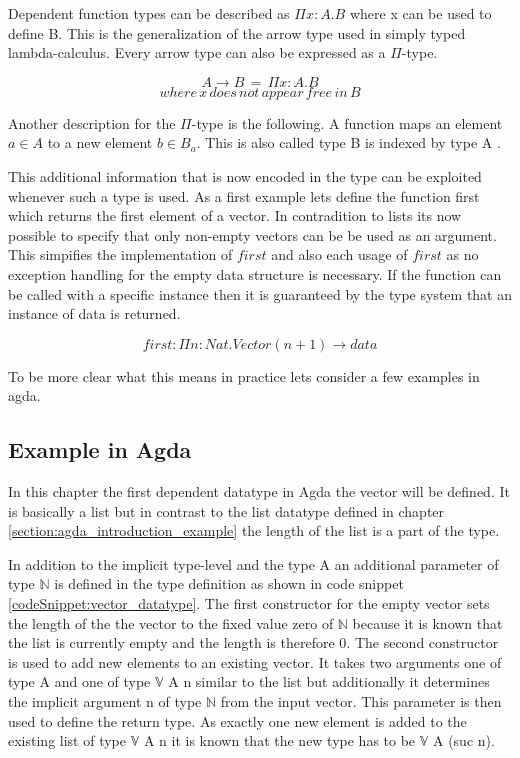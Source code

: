 Dependent function types can be described as $\Pi x : A. B$ where x can be used to define B. 
This is the generalization of the arrow type used in simply typed lambda-calculus. Every arrow type can also be expressed as a $\Pi$-type.

$$A \rightarrow B \, = \, \Pi x:A.B$$
$$where \, x \, does \, not \, appear \, free \, in \, B$$

Another description for the $\Pi$-type is the following. A function maps an element $a \in A$ to a new element $b \in B_a$. 
This is also called type B is indexed by type A \cite{10.1145/2841316}.


This additional information that is now encoded in the type can be exploited whenever such a type is used. As a first example lets define the function first which returns the first element of a vector.
In contradition to lists its now possible to specify that only non-empty vectors can be be used as an argument. 
This simpifies the implementation of $first$ and also each usage of $first$ as no exception handling for the empty data structure is necessary. 
If the function can be called with a specific instance then it is guaranteed by the type system that an instance of data is returned.

$$first : \Pi n : Nat.Vector(n+1) \rightarrow data$$


To be more clear what this means in practice lets consider a few examples in agda.

\subsection{Example in Agda}\label{section_dependent_types_example}
In this chapter the first dependent datatype in Agda the vector will be defined.
It is basically a list but in contrast to the list datatype defined in chapter \ref{section:agda_introduction_example} the length of the list is a part of the type.

In addition to the implicit type-level and the type A an additional parameter of type $\mathbb{N}$ is defined in the type definition as shown in code snippet \ref{codeSnippet:vector_datatype}.
The first constructor for the empty vector sets the length of the the vector to the fixed value zero of $\mathbb{N}$ because it is known that the list is currently empty and the length is therefore 0.
The second constructor is used to add new elements to an existing vector. It takes two arguments one of type A and one of type $\mathbb{V}$ A n similar to the list but additionally it determines the implicit argument n of type $\mathbb{N}$ from the input vector.
This parameter is then used to define the return type. As exactly one new element is added to the existing list of type $\mathbb{V}$ A n it is known that the new type has to be $\mathbb{V}$ A (suc n).

